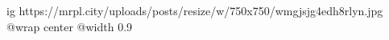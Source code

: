  
 
 
 
 

\ifcmt
  ig https://mrpl.city/uploads/posts/resize/w/750x750/wmgjsjg4edh8rlyn.jpg
  @wrap center
  @width 0.9
\fi
